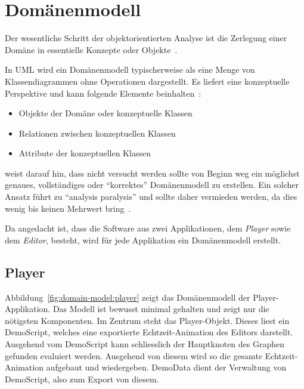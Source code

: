 
\section{Domänenmodell}
\label{sec:domain-model}

Der wesentliche Schritt der objektorientierten Analyse ist die Zerlegung einer
Domäne in essentielle Konzepte oder Objekte~\cite[S. 134]{larman_applying_2004}.

In UML wird ein Domänenmodell typischerweise als eine Menge von
Klassendiagrammen ohne Operationen dargestellt. Es liefert eine konzeptuelle
Perspektive und kann folgende Elemente beinhalten~\cite[S. 134]{larman_applying_2004}:
\begin{itemize}
    \item{Objekte der Domäne oder konzeptuelle Klassen}
    \item{Relationen zwischen konzeptuellen Klassen}
    \item{Attribute der konzeptuellen Klassen}
\end{itemize}

\citeauthor{larman_applying_2004} weist darauf hin, dass nicht versucht werden
sollte von Beginn weg ein möglichst genaues, vollständiges oder ``korrektes''
Domänenmodell zu erstellen. Ein solcher Ansatz führt zu ``analysis paralysis''
und sollte daher vermieden werden, da dies wenig bis keinen Mehrwert
bring~\cite[S. 133]{larman_applying_2004}.

Da angedacht ist, dass die Software aus zwei Applikationen, dem
\textit{Player} sowie dem \textit{Editor}, besteht, wird für jede
Applikation ein Domänenmodell erstellt.

\subsection{Player}
\label{subsec:domain-model:player}

Abbildung~\ref{fig:domain-model:player} zeigt das Domänenmodell der
Player-Applikation. Das Modell ist bewusst minimal gehalten und zeigt nur die
nötigsten Komponenten. Im Zentrum steht das Player-Objekt. Dieses liest ein
DemoScript, welches eine exportierte Echtzeit-Animation des Editors darstellt.
Ausgehend vom DemoScript kann schliesslich der Hauptknoten des Graphen gefunden
evaluiert werden. Ausgehend von diesem wird so die gesamte Echtzeit-Animation
aufgebaut und wiedergeben. DemoData dient der Verwaltung von DemoScript, also
zum Export von diesem.

